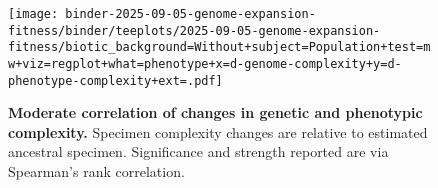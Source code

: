 \begin{figure}
\centering
\texttt{[image: binder-2025-09-05-genome-expansion-fitness/binder/teeplots/2025-09-05-genome-expansion-fitness/biotic\_background=Without+subject=Population+test=mw+viz=regplot+what=phenotype+x=d-genome-complexity+y=d-phenotype-complexity+ext=.pdf]}

\vspace{-1ex}

\caption{%
\textbf{Moderate correlation of changes in genetic and phenotypic complexity.}
\footnotesize
Specimen complexity changes are relative to estimated ancestral specimen.
Significance and strength reported are via Spearman's rank correlation.
}
\label{fig:gpcomplex-correlation}
\end{figure}
